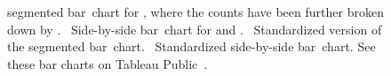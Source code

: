 \begin{figure}[h]
  \caption{ segmented
      bar~chart for ,
      where the counts have been further broken down
      by .
      ~Side-by-side
      bar~chart for 
      and .
      ~Standardized
      version of the segmented bar~chart.
      ~Standardized
      side-by-side bar~chart.
      See these bar charts on Tableau Public~.}
  \label{loan_app_type_home_seg_bar_plot}
\end{figure}

